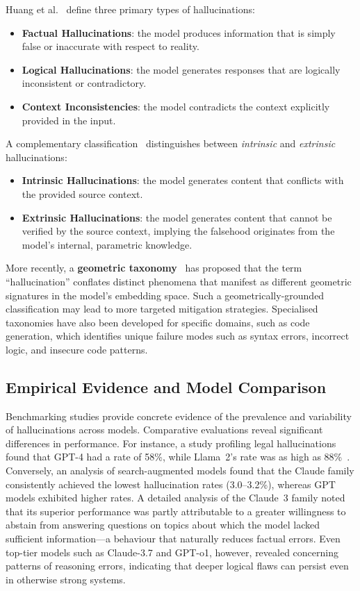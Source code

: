 Huang et al.~\cite{surveyHallucination} define three primary types of hallucinations:
\begin{itemize}
    \item \textbf{Factual Hallucinations}: the model produces information that is simply false or
          inaccurate with respect to reality.
    \item \textbf{Logical Hallucinations}: the model generates responses that are logically
          inconsistent or contradictory.
    \item \textbf{Context Inconsistencies}: the model contradicts the context explicitly provided
          in the input.
\end{itemize}

A complementary classification~\cite{surveyHallucination2} distinguishes between
\textit{intrinsic} and \textit{extrinsic} hallucinations:
\begin{itemize}
    \item \textbf{Intrinsic Hallucinations}: the model generates content that conflicts with the
          provided source context.
    \item \textbf{Extrinsic Hallucinations}: the model generates content that cannot be verified
          by the source context, implying the falsehood originates from the model's internal,
          parametric knowledge.
\end{itemize}

More recently, a \textbf{geometric taxonomy}~\cite{GeometricTaxonomy} has proposed that the term
``hallucination'' conflates distinct phenomena that manifest as different geometric signatures in
the model's embedding space. Such a geometrically-grounded classification may lead to more
targeted mitigation strategies. Specialised taxonomies have also been developed for specific
domains, such as code generation, which identifies unique failure modes such as syntax errors,
incorrect logic, and insecure code patterns.


\subsection{Empirical Evidence and Model Comparison}

Benchmarking studies provide concrete evidence of the prevalence and variability of hallucinations
across models. Comparative evaluations reveal significant differences in performance.
For instance, a study profiling legal hallucinations found that GPT-4 had a rate of 58\%, while
Llama~2's rate was as high as 88\%~\cite{LegalHallucinations}. Conversely, an analysis of
search-augmented models found that the Claude family consistently achieved the lowest
hallucination rates (3.0--3.2\%), whereas GPT models exhibited higher rates. A detailed analysis
of the Claude~3 family noted that its superior performance was partly attributable to a greater
willingness to abstain from answering questions on topics about which the model lacked sufficient
information—a behaviour that naturally reduces factual errors. Even top-tier models such as
Claude-3.7 and GPT-o1, however, revealed concerning patterns of reasoning errors, indicating that
deeper logical flaws can persist even in otherwise strong systems.

